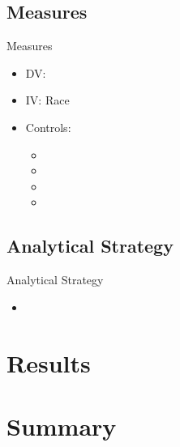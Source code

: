 \documentclass{beamer}
\begin{document}
\subsection{Measures}

\begin{frame}{Measures}
\begin{block}{}
\begin{itemize}

\item DV: 
\item IV: Race
\item  Controls:
  \begin{itemize}
  \item 
  \item 
  \item 
  \item 
\end{itemize}

\end{itemize}
\end{block}
\end{frame}

\subsection{Analytical Strategy}


\begin{frame}{Analytical Strategy}
\begin{block}{}
\begin{itemize}

\item

\end{itemize}
\end{block}
\end{frame}



\section{Results}





\section{Summary}
\end{document}
